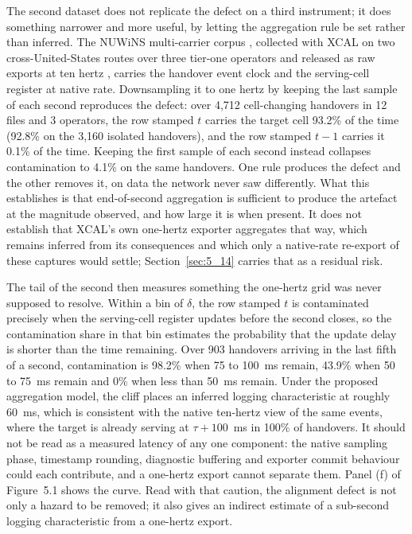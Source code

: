 The second dataset does not replicate the defect on a third instrument; it does something narrower and more useful, by letting the aggregation rule be set rather than inferred. The NUWiNS multi-carrier corpus \cite{ref40}, collected with XCAL on two cross-United-States routes over three tier-one operators and released as raw exports at ten hertz \cite{ref41}, carries the handover event clock and the serving-cell register at native rate. Downsampling it to one hertz by keeping the last sample of each second reproduces the defect: over 4,712 cell-changing handovers in 12 files and 3 operators, the row stamped $t$ carries the target cell 93.2\% of the time (92.8\% on the 3,160 isolated handovers), and the row stamped $t-1$ carries it 0.1\% of the time. Keeping the first sample of each second instead collapses contamination to 4.1\% on the same handovers. One rule produces the defect and the other removes it, on data the network never saw differently. What this establishes is that end-of-second aggregation is sufficient to produce the artefact at the magnitude observed, and how large it is when present. It does not establish that XCAL's own one-hertz exporter aggregates that way, which remains inferred from its consequences and which only a native-rate re-export of these captures would settle; Section~\ref{sec:5_14} carries that as a residual risk.

The tail of the second then measures something the one-hertz grid was never supposed to resolve. Within a bin of $\delta$, the row stamped $t$ is contaminated precisely when the serving-cell register updates before the second closes, so the contamination share in that bin estimates the probability that the update delay is shorter than the time remaining. Over 903 handovers arriving in the last fifth of a second, contamination is 98.2\% when 75 to 100~ms remain, 43.9\% when 50 to 75~ms remain and 0\% when less than 50~ms remain. Under the proposed aggregation model, the cliff places an inferred logging characteristic at roughly 60~ms, which is consistent with the native ten-hertz view of the same events, where the target is already serving at $\tau + 100$~ms in 100\% of handovers. It should not be read as a measured latency of any one component: the native sampling phase, timestamp rounding, diagnostic buffering and exporter commit behaviour could each contribute, and a one-hertz export cannot separate them. Panel (f) of Figure~5.1 shows the curve. Read with that caution, the alignment defect is not only a hazard to be removed; it also gives an indirect estimate of a sub-second logging characteristic from a one-hertz export.

